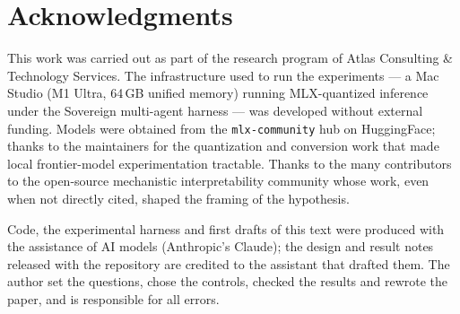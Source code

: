 \documentclass[11pt]{article}
\begin{document}











\section*{Acknowledgments}

This work was carried out as part of the research program of Atlas
Consulting \& Technology Services. The infrastructure used to run the
experiments --- a Mac Studio (M1 Ultra, 64\,GB unified memory) running
MLX-quantized inference under the Sovereign multi-agent harness --- was
developed without external funding. Models were obtained from the
\texttt{mlx-community} hub on HuggingFace; thanks to the maintainers
for the quantization and conversion work that made local frontier-model
experimentation tractable. Thanks to the many contributors to the
open-source mechanistic interpretability community whose work, even
when not directly cited, shaped the framing of the hypothesis.

Code, the experimental harness and first drafts of this text were
produced with the assistance of AI models (Anthropic's Claude); the
design and result notes released with the repository are credited to
the assistant that drafted them. The author set the questions, chose
the controls, checked the results and rewrote the paper, and is
responsible for all errors.

\printbibliography
\end{document}
